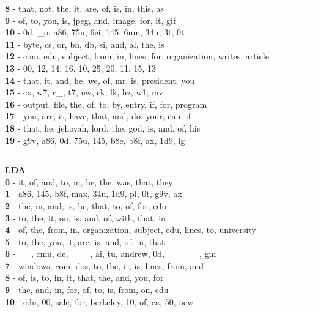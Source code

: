 \textbf{8} - that, not, the, it, are, of, is, in, this, as\\
\textbf{9} - of, to, you, is, jpeg, and, image, for, it, gif\\
\textbf{10} - 0d, \_o, a86, 75u, 6ei, 145, 6um, 34u, 3t, 0t\\
\textbf{11} - byte, cs, or, bh, db, si, and, al, the, is\\
\textbf{12} - com, edu, subject, from, in, lines, for, organization, writes, article\\
\textbf{13} - 00, 12, 14, 16, 10, 25, 20, 11, 15, 13\\
\textbf{14} - that, it, and, he, we, of, mr, is, president, you\\
\textbf{15} - cx, w7, c\_, t7, uw, ck, lk, hz, w1, mv\\
\textbf{16} - output, file, the, of, to, by, entry, if, for, program\\
\textbf{17} - you, are, it, have, that, and, do, your, can, if\\
\textbf{18} - that, he, jehovah, lord, the, god, is, and, of, his\\
\textbf{19} - g9v, a86, 0d, 75u, 145, b8e, b8f, ax, 1d9, lg\\
\hrule\vspace{2mm}
\noindent
\textbf{LDA}\vspace{2mm}\\
\vspace{2mm}
\noindent
\textbf{0} - it, of, and, to, in, he, the, was, that, they\\
\textbf{1} - a86, 145, b8f, max, 34u, 1d9, pl, 0t, g9v, ax\\
\textbf{2} - the, in, and, is, he, that, to, of, for, edu\\
\textbf{3} - to, the, it, on, is, and, of, with, that, in\\
\textbf{4} - of, the, from, in, organization, subject, edu, lines, to, university\\
\textbf{5} - to, the, you, it, are, is, and, of, in, that\\
\textbf{6} - \_\_, cmu, de, \_\_\_, ai, tu, andrew, 0d, \_\_\_\_\_, gm\\
\textbf{7} - windows, com, dos, to, the, it, is, lines, from, and\\
\textbf{8} - of, is, to, in, it, that, the, and, you, for\\
\textbf{9} - the, and, in, for, of, to, is, from, on, edu\\
\textbf{10} - edu, 00, sale, for, berkeley, 10, of, ca, 50, new\\
